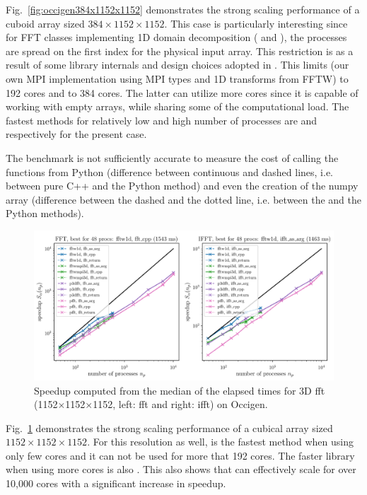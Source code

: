 Fig.~\ref{fig:occigen384x1152x1152} demonstrates the strong scaling performance
of a cuboid array sized $384\times1152\times1152$. This case is particularly
interesting since for FFT classes implementing 1D domain decomposition
( and ), the processes are spread on
the first index for the physical input array. This restriction is as a result
of some  library internals and design choices adopted in
. This limits  (our own MPI implementation
using MPI types and 1D transforms from FFTW) to 192 cores and
 to 384 cores. The latter can utilize more cores since it
is capable of working with empty arrays, while sharing some of the
computational load.
%
The fastest methods for relatively
low and high number of processes are  and
 respectively for the present case.

The benchmark is not sufficiently accurate to measure the cost of calling the
functions from Python (difference between continuous and dashed lines,
i.e. between pure C++ and the  Python method) and even the
creation of the numpy array (difference between the dashed and the dotted line,
i.e. between the  and the  Python
methods).


\begin{figure}[htp!]
\centering
\includegraphics[width=\linewidth]{tmp/fig_occigen_1152x1152x1152}
\caption{Speedup computed from the median of the elapsed times for 3D fft
(1152$\times$1152$\times$1152, left: fft and right: ifft) on Occigen.}
\label{fig:occigen1152x1152x1152}
\end{figure}

Fig.~\ref{fig:occigen1152x1152x1152} demonstrates the strong scaling
performance of a cubical array sized $1152\times1152\times1152$. For this
resolution as well,  is the fastest method when using only
few cores and it can not be used for more that 192 cores. The faster library
when using more cores is also . This also shows that
 can effectively scale for over 10,000 cores with a significant
increase in speedup.


